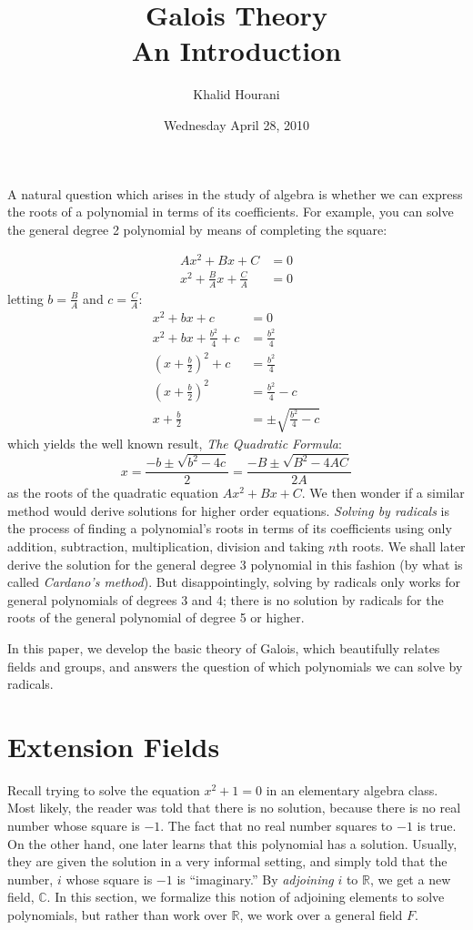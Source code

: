 \documentclass[12pt,leqno]{article}
\title{Galois Theory\\{\large An Introduction}}
\date{Wednesday April 28, 2010}
\author{Khalid Hourani}
\numberwithin{equation}{section}
\theoremstyle{plain}
\theoremstyle{definition}
\theoremstyle{remark}
\begin{document}
\begin{titlepage}
\maketitle\thispagestyle{empty}
\tableofcontents
\end{titlepage}

\thispagestyle{empty}
\setcounter{section}{0}
A natural question which arises in the study of algebra is whether we can express the roots of a polynomial in terms of its coefficients. For example, you can solve the general degree 2 polynomial by means of completing the square:

\begin{align*}Ax^2+Bx+C&=0\\x^2+\frac{B}{A}x+\frac{C}{A}&=0\end{align*} letting $b=\frac{B}{A}$ and $c=\frac{C}{A}$:
\begin{align*}x^2+bx+c&=0\\x^2+bx+\frac{b^2}{4}+c&=\frac{b^2}{4}\\(x+\frac{b}{2})^2+c&=\frac{b^2}{4}\\(x+\frac{b}{2})^2&=\frac{b^2}{4}-c\\x+\frac{b}{2}&=\pm\sqrt{\frac{b^2}{4}-c}\end{align*} which yields the well known result, \textit{The Quadratic Formula}:\[x=\frac{-b\pm\sqrt{b^2-4c}}{2}=\frac{-B\pm\sqrt{B^2-4AC}}{2A}\] as the roots of the quadratic equation $Ax^2+Bx+C$. We then wonder if a similar method would derive solutions for higher order equations. \textit{Solving by radicals} is the process of finding a polynomial's roots in terms of its coefficients using only addition, subtraction, multiplication, division and taking $n$th roots. We shall later derive the solution for the general degree 3 polynomial in this fashion (by what is called \textit{Cardano's method}). But disappointingly, solving by radicals only works for general polynomials of degrees 3 and 4; there is no solution by radicals for the roots of the general polynomial of degree 5 or higher.

In this paper, we develop the basic theory of Galois, which beautifully relates fields and groups, and answers the question of which polynomials we can solve by radicals.

\setcounter{page}{1}\section{Extension Fields}
Recall trying to solve the equation $x^2+1=0$ in an elementary algebra class. Most likely, the reader was told that there is no solution, because there is no real number whose square is $-1$. The fact that no real number squares to $-1$ is true. On the other hand, one later learns that this polynomial has a solution. Usually, they are given the solution in a very informal setting, and simply told that the number, $i$ whose square is $-1$ is ``imaginary.'' By \textit{adjoining} $i$ to $\mathbb{R}$, we get a new field, $\mathbb{C}$. In this section, we formalize this notion of adjoining elements to solve polynomials, but rather than work over $\mathbb{R}$, we work over a general field $F$. 
\end{document}
